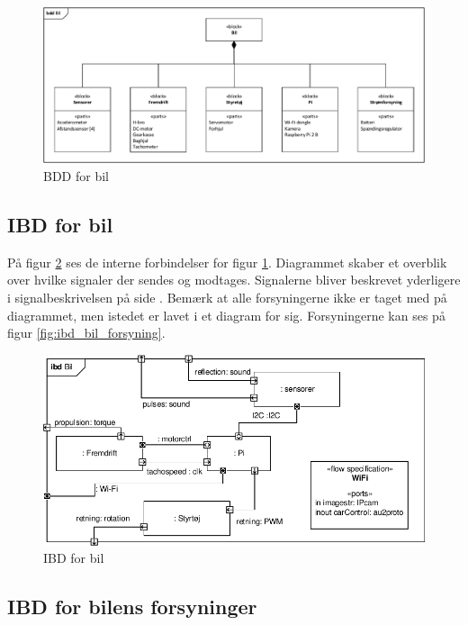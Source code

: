 \begin{figure}[h]
\centering
\includegraphics[width=\textwidth]{../fig/diagrammer/bil/bdd_bil.pdf}
\caption{BDD for bil}
\label{fig:bdd_bil}
\end{figure}

\subsection{IBD for bil} %
På figur \ref{fig:ibd_bil} ses de interne forbindelser for figur \ref{fig:bdd_bil}. Diagrammet skaber et overblik over hvilke signaler der sendes og modtages. Signalerne bliver beskrevet yderligere i signalbeskrivelsen på side \pageref{sec:signalbeskrivelse}. Bemærk at alle forsyningerne ikke er taget med på diagrammet, men istedet er lavet i et diagram for sig. Forsyningerne kan ses på figur \ref{fig:ibd_bil_forsyning}.

\begin{figure}[h]
\centering
\includegraphics[width=\textwidth]{../fig/diagrammer/bil/ibd_bil.pdf}
\caption{IBD for bil}
\label{fig:ibd_bil}
\end{figure}

\subsection{IBD for bilens forsyninger} %

